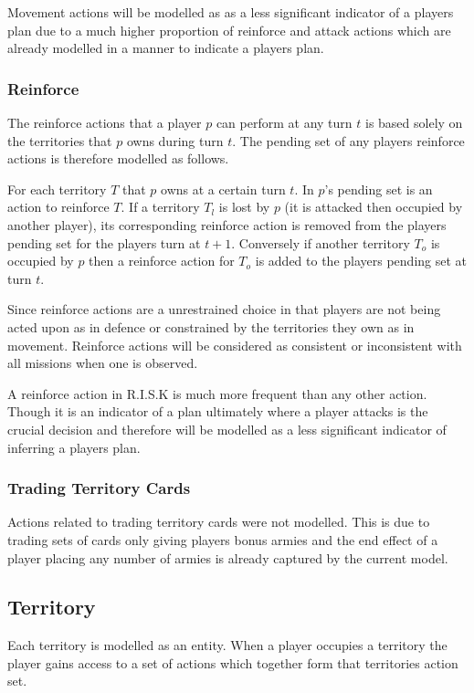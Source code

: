 \documentclass[parskip]{cs4rep}
\begin{document}
Movement actions will be modelled as as a less significant indicator of a players plan due to a much higher proportion of reinforce and attack actions which are already modelled in a manner to indicate a players plan.

\subsubsection{Reinforce}

The reinforce actions that a player $p$ can perform at any turn $t$ is based solely on the territories that $p$ owns during turn $t$. The pending set of any players reinforce actions is therefore modelled as follows. 

For each territory $T$ that $p$ owns at a certain turn $t$. In $p$'s pending set is an action to reinforce $T$. If a territory $T_{l}$ is lost by $p$ (it is attacked then occupied by another player), its corresponding reinforce action is removed from the players pending set for the players turn at $t+1$. Conversely if another territory $T_{o}$ is occupied by $p$ then a reinforce action for $T_{o}$ is added to the players pending set at turn $t$.

Since reinforce actions are a unrestrained choice in that players are not being acted upon as in defence or constrained by the territories they own as in movement. Reinforce actions will be considered as consistent or inconsistent with all missions when one is observed.

A reinforce action in R.I.S.K is much more frequent than any other action. Though it is an indicator of a plan ultimately where a player attacks is the crucial decision and therefore will be modelled as a less significant indicator of inferring a players plan.

\subsubsection{Trading Territory Cards}

Actions related to trading territory cards were not modelled. This is due to trading sets of cards only giving players bonus armies and the end effect of a player placing any number of armies is already captured by the current model.

\subsection{Territory}

Each territory is modelled as an entity. When a player occupies a territory the player gains access to a set of actions which together form that territories action set.
\end{document}
